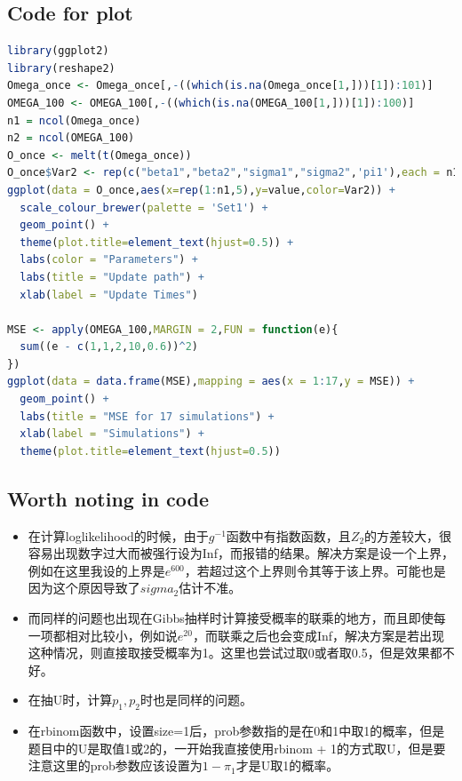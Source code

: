 \documentclass[11pt]{article}
\begin{document}
  \subsection{Code for plot}
\begin{lstlisting}[language=R] 
library(ggplot2)
library(reshape2)
Omega_once <- Omega_once[,-((which(is.na(Omega_once[1,]))[1]):101)]
OMEGA_100 <- OMEGA_100[,-((which(is.na(OMEGA_100[1,]))[1]):100)]
n1 = ncol(Omega_once)
n2 = ncol(OMEGA_100)
O_once <- melt(t(Omega_once))
O_once$Var2 <- rep(c("beta1","beta2","sigma1","sigma2",'pi1'),each = n1)
ggplot(data = O_once,aes(x=rep(1:n1,5),y=value,color=Var2)) +
  scale_colour_brewer(palette = 'Set1') +
  geom_point() + 
  theme(plot.title=element_text(hjust=0.5)) + 
  labs(color = "Parameters") +
  labs(title = "Update path") +
  xlab(label = "Update Times") 

MSE <- apply(OMEGA_100,MARGIN = 2,FUN = function(e){
  sum((e - c(1,1,2,10,0.6))^2)
})
ggplot(data = data.frame(MSE),mapping = aes(x = 1:17,y = MSE)) + 
  geom_point() +
  labs(title = "MSE for 17 simulations") +
  xlab(label = "Simulations") +
  theme(plot.title=element_text(hjust=0.5))  
\end{lstlisting}

\subsection{Worth noting in code}
\begin{itemize}
  \item 在计算loglikelihood的时候，由于$g^{-1}$函数中有指数函数，且$Z_2$的方差较大，很容易出现数字过大而被强行设为Inf，而报错的结果。解决方案是设一个上界，例如在这里我设的上界是$e^{600}$，若超过这个上界则令其等于该上界。可能也是因为这个原因导致了$sigma_2$估计不准。
  \item 而同样的问题也出现在Gibbs抽样时计算接受概率的联乘的地方，而且即使每一项都相对比较小，例如说$e^{20}$，而联乘之后也会变成Inf，解决方案是若出现这种情况，则直接取接受概率为1。这里也尝试过取0或者取0.5，但是效果都不好。
  \item 在抽U时，计算$p_1,p_2$时也是同样的问题。 
  \item 在rbinom函数中，设置size=1后，prob参数指的是在0和1中取1的概率，但是题目中的U是取值1或2的，一开始我直接使用rbinom + 1的方式取U，但是要注意这里的prob参数应该设置为$1-\pi_1$才是U取1的概率。
\end{itemize}
\end{document}
